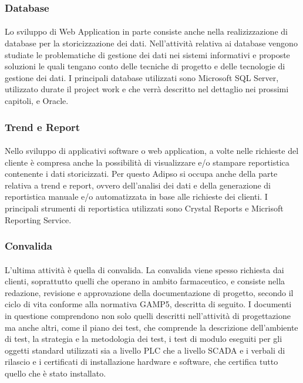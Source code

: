   \subsubsection{Database}
  \paragraph{}
  Lo sviluppo di Web Application in parte consiste anche nella realizizzazione di database per la storicizzazione 
  dei dati. Nell'attività relativa ai database vengono studiate le problematiche di gestione dei dati 
  nei sistemi informativi e proposte soluzioni le quali tengano conto delle tecniche di progetto e
  delle tecnologie di gestione dei dati. I principali database utilizzati sono Microsoft SQL Server, utilizzato 
  durate il project work e che verrà descritto nel dettaglio nei prossimi capitoli, e Oracle.
  \subsubsection{Trend e Report}
  \paragraph{}
  Nello sviluppo di applicativi software o web application, a volte nelle richieste del cliente è compresa 
  anche la possibilità di visualizzare e/o stampare reportistica contenente i dati storicizzati. Per questo 
  Adipso si occupa anche della parte relativa a trend e report, ovvero dell'analisi dei dati e della 
  generazione di reportistica manuale e/o automatizzata in base alle richieste dei clienti. I principali 
  strumenti di reportistica utilizzati sono Crystal Reports e Micrisoft Reporting Service.
  \subsubsection{Convalida}
  \paragraph{}
  L'ultima attività è quella di convalida. La convalida viene spesso richiesta dai clienti, soprattutto 
  quelli che operano in ambito farmaceutico, e consiste nella redazione, revisione e approvazione 
  della documentazione di progetto, secondo il ciclo di vita conforme alla normativa GAMP5, descritta di seguito. 
  I documenti in questione comprendono non solo quelli descritti nell'attività di progettazione ma anche altri,
  come il piano dei test, che comprende la descrizione dell'ambiente di test, la strategia e la metodologia dei test, 
  i test di modulo eseguiti per gli oggetti standard utilizzati sia a livello PLC che a livello SCADA e i 
  verbali di rilascio e i certificati di installazione hardware e software, che certifica tutto quello che 
  è stato installato.
